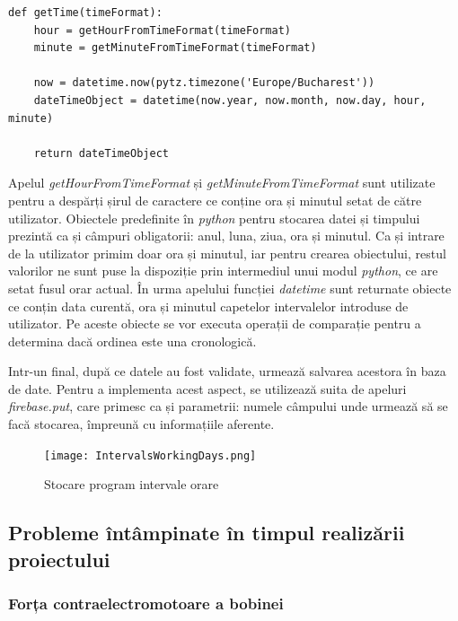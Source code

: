 \vspace{1em}
\begin{lstlisting}
def getTime(timeFormat):
    hour = getHourFromTimeFormat(timeFormat)
    minute = getMinuteFromTimeFormat(timeFormat)

    now = datetime.now(pytz.timezone('Europe/Bucharest'))
    dateTimeObject = datetime(now.year, now.month, now.day, hour, minute)

    return dateTimeObject
\end{lstlisting}
\vspace{2em} 

	Apelul \textit{getHourFromTimeFormat} și \textit{getMinuteFromTimeFormat} sunt utilizate pentru a despărți șirul de caractere ce conține ora și minutul setat de către utilizator. Obiectele predefinite în \textit{python} pentru stocarea datei și timpului prezintă ca și câmpuri obligatorii: anul, luna, ziua, ora și minutul. Ca și intrare de la utilizator primim doar ora și minutul, iar pentru crearea obiectului, restul valorilor ne sunt puse la dispoziție prin intermediul unui modul \textit{python}, ce are setat fusul orar actual. În urma apelului funcției \textit{datetime} sunt returnate obiecte ce conțin data curentă, ora și minutul capetelor intervalelor introduse de utilizator. Pe aceste obiecte se vor executa operații de comparație pentru a determina dacă ordinea este una cronologică.

	Intr-un final, după ce datele au fost validate, urmează salvarea acestora în baza de date. Pentru a implementa acest aspect, se utilizează suita de apeluri \textit{firebase.put}, care primesc ca și parametrii: numele câmpului unde urmează să se facă stocarea, împreună cu informațiile aferente.


\begin{figure}[H]
   	\centering
    	\texttt{[image: IntervalsWorkingDays.png]}
	\caption{Stocare program intervale orare}
\end{figure}

\subsection{Probleme întâmpinate în timpul realizării proiectului}

\subsubsection{Forța contraelectromotoare a bobinei}

